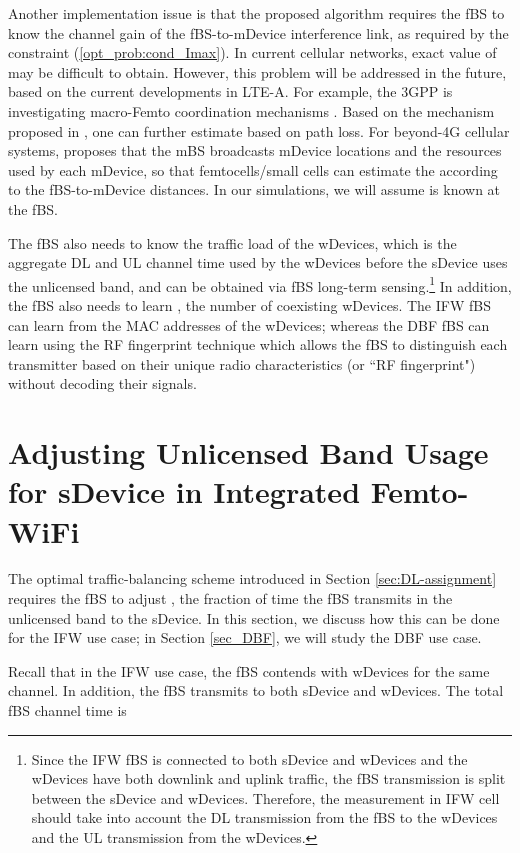 \documentclass[journal,final,letterpaper,10pt,doublecolumn,twoside]{IEEEtran}
\begin{document}
Another implementation issue is that the proposed algorithm requires
the fBS to know the channel gain  of the fBS-to-mDevice
interference link, as required by the constraint
(\ref{opt_prob:cond_Imax}). In current cellular networks, exact
value of  may be difficult to obtain. However, this
problem will be addressed in the future, based on the current
developments in LTE-A. For example, the 3GPP is investigating
macro-Femto coordination mechanisms \cite{3GPP_TR_36.921_femto}.
Based on the mechanism proposed in \cite[Sec.\
7.2.2.6.2]{3GPP_TR_36.921_femto}, one can further estimate
 based on path loss. For beyond-4G cellular systems,
\cite{mBS_broadcastLocRB} proposes that the mBS broadcasts mDevice
locations and the resources used by each mDevice, so that
femtocells/small cells can estimate the  according
to the fBS-to-mDevice distances. In our simulations, we will assume
 is known at the fBS.

The fBS also needs to know the traffic load  of the
wDevices, which is the aggregate DL and UL channel time used by the wDevices before
the sDevice uses the unlicensed band, and can be obtained via fBS
long-term sensing.\footnote{Since the IFW fBS is connected to both sDevice and wDevices and the wDevices have both downlink and uplink traffic, the fBS transmission is split between the sDevice and wDevices. Therefore, the   measurement in IFW cell should take into account the DL transmission from the fBS to the wDevices and the UL transmission from the wDevices.} In addition, the fBS also needs to learn ,
the number of coexisting wDevices.  The IFW fBS can learn 
from the MAC addresses of the wDevices; whereas the DBF fBS can
learn   using the RF fingerprint technique
\cite{RF-fingerprint} which allows the fBS to distinguish each
transmitter based on their unique radio characteristics (or ``RF
fingerprint") without decoding their signals.


\section{Adjusting Unlicensed Band Usage for sDevice in Integrated  Femto-WiFi}\label{sec_IFW}

The optimal traffic-balancing scheme introduced in Section \ref{sec:DL-assignment} requires the fBS to adjust , the fraction of time the fBS transmits in the unlicensed band to the sDevice. In this section, we discuss how this can be done for the  IFW use case; in Section \ref{sec_DBF}, we will study the DBF use case.

Recall that in the IFW use case, the fBS contends with  wDevices for the same channel. In addition, the fBS transmits to both sDevice and wDevices. The total fBS channel time is
\end{document}
